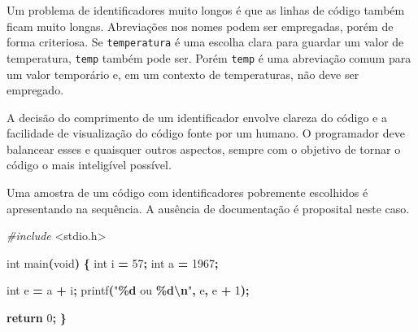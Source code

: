 \documentclass[
  11pt,
  a4paper,
]{scrbook}
\newenvironment{Shaded}{\begin{snugshade}}{\end{snugshade}}
\newcommand{\ControlFlowTok}[1]{\textcolor[rgb]{0.13,0.29,0.53}{\textbf{#1}}}
\newcommand{\DataTypeTok}[1]{\textcolor[rgb]{0.13,0.29,0.53}{#1}}
\newcommand{\DecValTok}[1]{\textcolor[rgb]{0.00,0.00,0.81}{#1}}
\newcommand{\ImportTok}[1]{#1}
\newcommand{\NormalTok}[1]{#1}
\newcommand{\OperatorTok}[1]{\textcolor[rgb]{0.81,0.36,0.00}{\textbf{#1}}}
\newcommand{\PreprocessorTok}[1]{\textcolor[rgb]{0.56,0.35,0.01}{\textit{#1}}}
\newcommand{\SpecialCharTok}[1]{\textcolor[rgb]{0.81,0.36,0.00}{\textbf{#1}}}
\newcommand{\StringTok}[1]{\textcolor[rgb]{0.31,0.60,0.02}{#1}}
\begin{document}
Um problema de identificadores muito longos é que as linhas de código
também ficam muito longas. Abreviações nos nomes podem ser empregadas,
porém de forma criteriosa. Se \texttt{temperatura} é uma escolha clara
para guardar um valor de temperatura, \texttt{temp} também pode ser.
Porém \texttt{temp} é uma abreviação comum para um valor temporário e,
em um contexto de temperaturas, não deve ser empregado.

\begin{tcolorbox}[enhanced jigsaw, arc=.35mm, bottomtitle=1mm, colbacktitle=quarto-callout-tip-color!10!white, title=\textcolor{quarto-callout-tip-color}{\faLightbulb}\hspace{0.5em}{Dica}, toprule=.15mm, left=2mm, opacityback=0, colback=white, colframe=quarto-callout-tip-color-frame, opacitybacktitle=0.6, bottomrule=.15mm, leftrule=.75mm, toptitle=1mm, coltitle=black, titlerule=0mm, rightrule=.15mm, breakable]

A decisão do comprimento de um identificador envolve clareza do código e
a facilidade de visualização do código fonte por um humano. O
programador deve balancear esses e quaisquer outros aspectos, sempre com
o objetivo de tornar o código o mais inteligível possível.

\end{tcolorbox}

Uma amostra de um código com identificadores pobremente escolhidos é
apresentando na sequência. A ausência de documentação é proposital neste
caso.

\begin{Shaded}
\begin{Highlighting}[]
\PreprocessorTok{\#include }\ImportTok{\textless{}stdio.h\textgreater{}}

\DataTypeTok{int}\NormalTok{ main}\OperatorTok{(}\DataTypeTok{void}\OperatorTok{)} \OperatorTok{\{}
    \DataTypeTok{int}\NormalTok{ i }\OperatorTok{=} \DecValTok{57}\OperatorTok{;}
    \DataTypeTok{int}\NormalTok{ a }\OperatorTok{=} \DecValTok{1967}\OperatorTok{;}

    \DataTypeTok{int}\NormalTok{ e }\OperatorTok{=}\NormalTok{ a }\OperatorTok{+}\NormalTok{ i}\OperatorTok{;}
\NormalTok{    printf}\OperatorTok{(}\StringTok{"}\SpecialCharTok{\%d}\StringTok{ ou }\SpecialCharTok{\%d\textbackslash{}n}\StringTok{"}\OperatorTok{,}\NormalTok{ e}\OperatorTok{,}\NormalTok{ e }\OperatorTok{+} \DecValTok{1}\OperatorTok{);}

    \ControlFlowTok{return} \DecValTok{0}\OperatorTok{;}
\OperatorTok{\}}
\end{Highlighting}
\end{Shaded}
\end{document}
